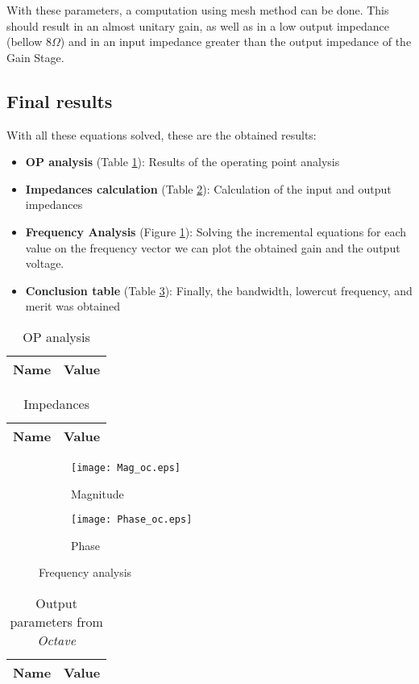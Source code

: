 With these parameters, a computation using mesh method can be done. This should result in an almost unitary gain, as well as in a low output impedance (bellow $8\Omega$) and in an input impedance greater than the output impedance of the Gain Stage.


\subsection{Final results}
\label{subsection:Octave_Results}
\indent

With all these equations solved, these are the obtained results:

\begin{itemize}
    \item \textbf{OP analysis} (Table \ref{tab:OC}): Results of the operating point analysis
    \item \textbf{Impedances calculation} (Table \ref{tab:Impedances}): Calculation of the input and output impedances
    \item \textbf{Frequency Analysis} (Figure \ref{fig:FreqA}): Solving the incremental equations for each value on the frequency vector we can plot the obtained gain and the output voltage.
    \item \textbf{Conclusion table} (Table \ref{tab:OutputParam}): Finally, the bandwidth, lowercut frequency, and merit was obtained
\end{itemize}


\begin{table}[H]
  \centering
  \begin{tabular}{|l|r|}
    \hline    
    {\bf Name} & {\bf Value} \\ \hline
    
  \end{tabular}
  \caption{OP analysis }
  \label{tab:OC}
\end{table}


\begin{table}[H]
  \centering
  \begin{tabular}{|l|r|}
    \hline    
    {\bf Name} & {\bf Value} \\ \hline
    
  \end{tabular}
  \caption{Impedances}
  \label{tab:Impedances}
\end{table}



\begin{figure}[H]
\centering
\begin{subfigure}{.48\textwidth}
  \centering
  \texttt{[image: Mag\_oc.eps]}
  \caption{Magnitude}
\end{subfigure}
\begin{subfigure}{.48\textwidth}
  \centering
  \texttt{[image: Phase\_oc.eps]}
  \caption{Phase}
\end{subfigure}
\caption{Frequency analysis}
\label{fig:FreqA}
\end{figure}



\begin{table}[H]
  \centering
  \begin{tabular}{|l|r|}
    \hline    
    {\bf Name} & {\bf Value} \\ \hline
    
  \end{tabular}
  \caption{Output parameters from {\it Octave} }
  \label{tab:OutputParam}
\end{table}
